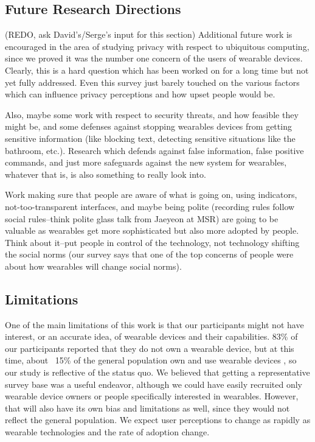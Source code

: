 \documentclass{acm_proc_article-sp}
\begin{document}
\subsection{Future Research Directions}
(REDO, ask David's/Serge's input for this section) Additional future work is encouraged in the area of studying privacy with respect to ubiquitous computing, since we proved it was the number one concern of the users of wearable devices. Clearly, this is a hard question which has been worked on for a long time but not yet fully addressed. Even this survey just barely touched on the various factors which can influence privacy perceptions and how upset people would be. 

 Also, maybe some work with respect to security threats, and how feasible they might be, and some defenses against stopping wearables devices from getting sensitive information (like blocking text, detecting sensitive situations like the bathroom, etc.). Research which defends against false information, false positive commands, and just more safeguards against the new system for wearables, whatever that is, is also something to really look into. 
 
 Work making sure that people are aware of what is going on, using indicators, not-too-transparent interfaces, and maybe being polite (recording rules follow social rules--think polite glass talk from Jaeyeon at MSR) are going to be valuable as wearables get more sophisticated but also more adopted by people. Think about it--put people in control of the technology, not technology shifting the social norms (our survey says that one of the top concerns of people were about how wearables will change social norms). 

\subsection{Limitations}
One of the main limitations of this work is that our participants might not have interest, or an accurate idea, of wearable devices and their capabilities. 83\% of our participants reported that they do not own a wearable device, but at this time, about ~15\% of the general population own and use wearable devices \cite{Nilsen}\cite{WearableStatNews}, so our study is reflective of the status quo. We believed that getting a representative survey base was a useful endeavor, although we could have easily recruited only wearable device owners or people specifically interested in wearables. However, that will also have its own bias and limitations as well, since they would not reflect the general population. We expect user perceptions to change as rapidly as wearable technologies and the rate of adoption change. 
\end{document}
